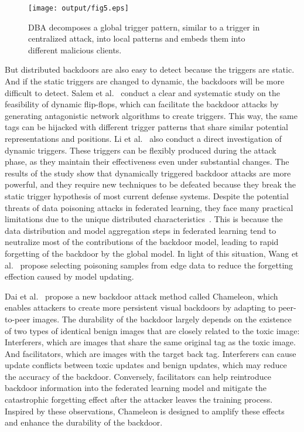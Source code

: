 \begin{figure}[h]
    \centering
    \texttt{[image: output/fig5.eps]}
     \caption{DBA decomposes a global trigger pattern, similar to a
     trigger in centralized attack, into local patterns and embeds them
     into different malicious clients.}
     \label{fig5}
\end{figure}

But distributed backdoors are also easy to detect
because the triggers are static. And if the static triggers are
changed to dynamic, the backdoors will be more diﬀicult
to detect. Salem et al.~\cite{salem2022dynamic} conduct a clear and systematic
study on the feasibility of dynamic flip-flops, which can
facilitate the backdoor attacks by generating antagonistic
network algorithms to create triggers. This way, the same
tags can be hijacked with different trigger patterns that
share similar potential representations and positions. Li
et al.~\cite{li2020rethinking} also conduct a direct investigation of dynamic
triggers. These triggers can be flexibly produced during the
attack phase, as they maintain their effectiveness even
under substantial changes. The results of the study show
that dynamically triggered backdoor attacks are more
powerful, and they require new techniques to be defeated
because they break the static trigger hypothesis of most
current defense systems. Despite the potential threats of data poisoning attacks
in federated learning, they face many practical limitations
due to the unique distributed characteristics~\cite{wang2020attack}. This
is because the data distribution and model aggregation
steps in federated learning tend to neutralize most of
the contributions of the backdoor model, leading to rapid
forgetting of the backdoor by the global model. In light of
this situation, Wang et al.~\cite{wang2020attack} propose selecting poisoning
samples from edge data to reduce the forgetting effection
caused by model updating. 

Dai et al.~\cite{dai2023chameleon} propose a new backdoor attack method
called Chameleon, which enables attackers to create more
persistent visual backdoors by adapting to peer-to-peer
images. The durability of the backdoor largely depends on
the existence of two types of identical benign images that
are closely related to the toxic image: Interferers, which
are images that share the same original tag as the toxic
image. And facilitators, which are images with the target
back tag. Interferers can cause update conflicts between
toxic updates and benign updates, which may reduce the
accuracy of the backdoor. Conversely, facilitators can help
reintroduce backdoor information into the federated
learning model and mitigate the catastrophic forgetting effect
after the attacker leaves the training process. Inspired by
these observations, Chameleon is designed to amplify these
effects and enhance the durability of the backdoor.  

